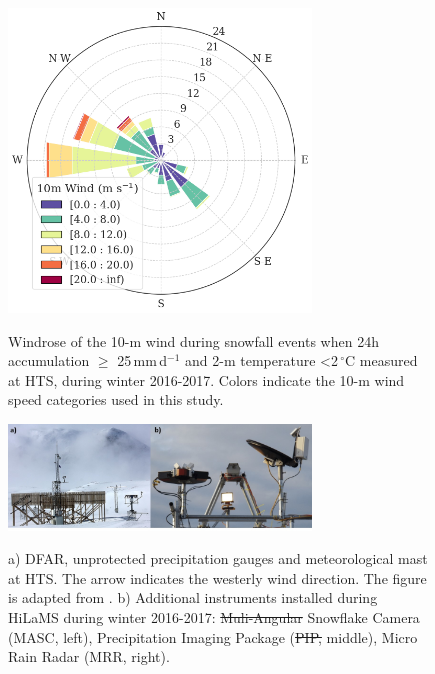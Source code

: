 \documentclass{ametsocV5}
\providecommand{\DIFadd}[1]{{\protect\color{blue}\uwave{#1}}} %
\providecommand{\DIFdel}[1]{{\protect\color{red}\sout{#1}}}                      %
\providecommand{\DIFaddFL}[1]{\DIFadd{#1}} %
\providecommand{\DIFdelFL}[1]{\DIFdel{#1}} %
\providecommand{\DIFaddbeginFL}{} %
\providecommand{\DIFaddendFL}{} %
\providecommand{\DIFdelbeginFL}{} %
\providecommand{\DIFdelendFL}{} %
\newcommand{\DIFscaledelfig}{0.5}
\newlength{\DIFdelgraphicswidth} %
\newlength{\DIFdelgraphicsheight} %
\newcommand{\DIFaddincludegraphics}[2][]{{\color{blue}\fbox{\DIFOincludegraphics[#1]{#2}}}} %
\newcommand{\DIFdelincludegraphics}[2][]{%
\sbox{\DIFdelgraphicsbox}{\DIFOincludegraphics[#1]{#2}}%
\settoboxwidth{\DIFdelgraphicswidth}{\DIFdelgraphicsbox} %
\settoboxtotalheight{\DIFdelgraphicsheight}{\DIFdelgraphicsbox} %
\scalebox{\DIFscaledelfig}{%
\parbox[b]{\DIFdelgraphicswidth}{\usebox{\DIFdelgraphicsbox}\\[-\baselineskip] \rule{\DIFdelgraphicswidth}{0em}}\llap{\resizebox{\DIFdelgraphicswidth}{\DIFdelgraphicsheight}{%
\setlength{\unitlength}{\DIFdelgraphicswidth}%
\begin{picture}(1,1)%
\thicklines\linethickness{2pt} %
{\color[rgb]{1,0,0}\put(0,0){\framebox(1,1){}}}%
{\color[rgb]{1,0,0}\put(0,0){\line( 1,1){1}}}%
{\color[rgb]{1,0,0}\put(0,1){\line(1,-1){1}}}%
\end{picture}%
}\hspace*{3pt}}} %
} %
\DeclareRobustCommand{\DIFaddbeginFL}{\DIFOaddbeginFL \let\includegraphics\DIFaddincludegraphics} %
\DeclareRobustCommand{\DIFaddendFL}{\DIFOaddendFL \let\includegraphics\DIFOincludegraphics} %
\DeclareRobustCommand{\DIFdelbeginFL}{\DIFOdelbeginFL \let\includegraphics\DIFdelincludegraphics} %
\DeclareRobustCommand{\DIFdelendFL}{\DIFOaddendFL \let\includegraphics\DIFOincludegraphics} %
\begin{document}
\begin{figure}[t]
	\noindent\includegraphics[width=19pc,angle=0]{fig2.png}\\
	\caption{Windrose of the 10-m wind during snowfall events when 24h accumulation $\geq$ 25\,mm\,d$^{-1}$ and 2-m temperature \textless 2\,$^{\circ}$C measured at HTS, during winter 2016-2017. Colors indicate the 10-m wind speed categories used in this study. 
	}
	\label{fig:windrose}
\end{figure}

\begin{figure}[t]
	\noindent\includegraphics[width=19pc,angle=0]{fig3.jpg}\\
	\caption{
		a) DFAR, unprotected precipitation gauges and meteorological mast at HTS. The arrow indicates the westerly wind direction. The figure is adapted from \protect\citet{wolff_derivation_2015}. b) Additional instruments installed during HiLaMS during winter 2016-2017: \DIFdelbeginFL \DIFdelFL{Muli-Angular }\DIFdelendFL \DIFaddbeginFL \DIFaddFL{Muli-Angle }\DIFaddendFL Snowflake Camera (MASC, left), Precipitation Imaging Package (\DIFdelbeginFL \DIFdelFL{PIP, }\DIFdelendFL middle), Micro Rain Radar (MRR, right).}
	\label{fig:instruments}
\end{figure}
\end{document}
